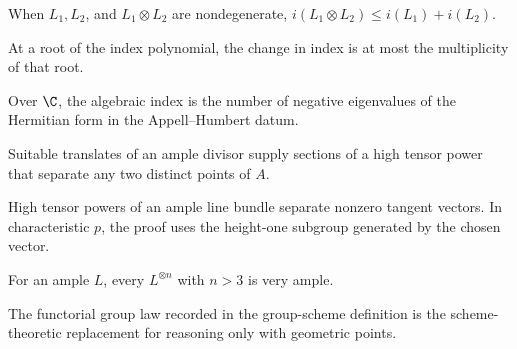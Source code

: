 \begin{proposition}
\label{mumford3-index-subadditivity}
When $L_1,L_2$, and $L_1\otimes L_2$ are nondegenerate,
$i(L_1\otimes L_2)\leq i(L_1)+i(L_2)$.
\notready
\end{proposition}

\begin{proposition}
\label{mumford3-index-root-multiplicity-bound}
At a root of the index polynomial, the change in index is at most the
multiplicity of that root.
\notready
\end{proposition}

\begin{corollary}
\label{mumford3-complex-index-corollary}
Over $\C$, the algebraic index is the number of negative eigenvalues of the
Hermitian form in the Appell--Humbert datum.
\notready
\end{corollary}

\begin{lemma}
\label{mumford3-support-separation}
Suitable translates of an ample divisor supply sections of a high tensor power
that separate any two distinct points of $A$.
\notready
\end{lemma}

\begin{lemma}
\label{mumford3-tangent-separation}
High tensor powers of an ample line bundle separate nonzero tangent vectors.
In characteristic $p$, the proof uses the height-one subgroup generated by the
chosen vector.
\notready
\end{lemma}

\begin{theorem}
\label{mumford3-very-ample-power}
For an ample $L$, every $L^{\otimes n}$ with $n>3$ is very ample.
\notready
\end{theorem}

\begin{remark}
\label{mumford3-group-scheme}
The functorial group law recorded in the group-scheme definition is the
scheme-theoretic replacement for reasoning only with geometric points.
\notready
\end{remark}

